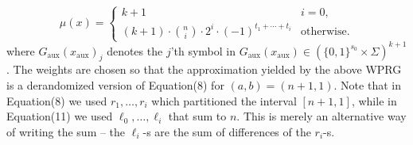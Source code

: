 \documentclass[10pt,a4paper]{article}
\begin{document}
\begin{equation}\tag{11}\mu(x)=\begin{cases}k+1&i=0,\\(k+1)\cdot\binom ni\cdot2^i\cdot(-1)^{t_1+\cdots+t_i}&\text{otherwise.}\end{cases}\end{equation}
where $G_{\mathrm{aux}}(x_{\mathrm{aux}})_j$ denotes the $j$'th symbol in $G_{\mathrm{aux}}(x_{\mathrm{aux}})\in(\{0,1\}^{s_0}\times\Sigma)^{k+1}$.
The weights are chosen so that the approximation yielded by the above WPRG is a derandomized version of Equation(8) for $(a,b)=(n+1,1)$. Note that in Equation(8) we used $r_1,\ldots,r_i$ which partitioned the interval $[n+1,1]$, while in Equation(11) we used $\ell_0,\ldots,\ell_i$ that sum to $n$. This is merely an alternative way of writing the sum -- the $\ell_i$-s are the sum of differences of the $r_i$-s.
\end{document}
